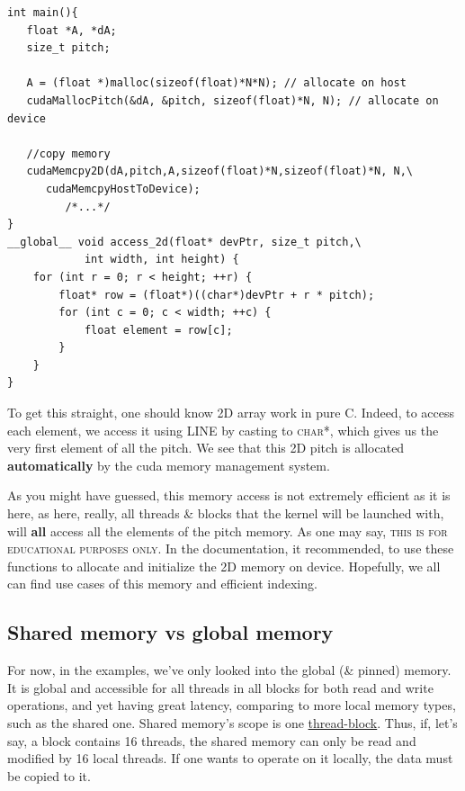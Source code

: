 \documentclass[12pt]{article}
\begin{document}
\begin{listing}[!ht]
\begin{verbatim}
int main(){
   float *A, *dA;
   size_t pitch;
     
   A = (float *)malloc(sizeof(float)*N*N); // allocate on host
   cudaMallocPitch(&dA, &pitch, sizeof(float)*N, N); // allocate on device

   //copy memory
   cudaMemcpy2D(dA,pitch,A,sizeof(float)*N,sizeof(float)*N, N,\
      cudaMemcpyHostToDevice);
         /*...*/
}
__global__ void access_2d(float* devPtr, size_t pitch,\
            int width, int height) {
    for (int r = 0; r < height; ++r) {
        float* row = (float*)((char*)devPtr + r * pitch);
        for (int c = 0; c < width; ++c) {
            float element = row[c];
        }
    }
}
\end{verbatim}
\caption{To get this straight, one should know 2D array work in pure C. 
Indeed, to access each element, we access it using LINE by casting to \textsc{char*}, which 
gives us the very first element of all the pitch. We see that this 2D pitch is allocated 
    \textbf{automatically} by the cuda memory management system.\cite{blog_2020}}
\label{allocation2d}
\end{listing}
As you might have guessed, this memory access is not extremely efficient as it is here, as here, really, 
all threads \& blocks that the kernel will be launched with, will \textbf{all} access all the elements of the 
pitch memory. As one may say, \textsc{this is for educational purposes only}. In the documentation, it recommended, 
to use these functions to allocate and initialize the 2D memory on device. Hopefully, we all can find 
use cases of this memory and efficient indexing.

\subsection{Shared memory vs global memory}

For now, in the examples, we've only looked into the global (\& pinned) memory. It is global and accessible 
for all threads in all blocks for both read and write operations, and yet having great latency, comparing to 
more local memory types, such as the shared one. Shared memory's scope is one \underline{thread-block}. Thus, if, let's say,
a block contains 16 threads, the shared memory can only be read and modified by 16 local threads. If one wants to operate on it 
locally, the data must be copied to it.
\end{document}

